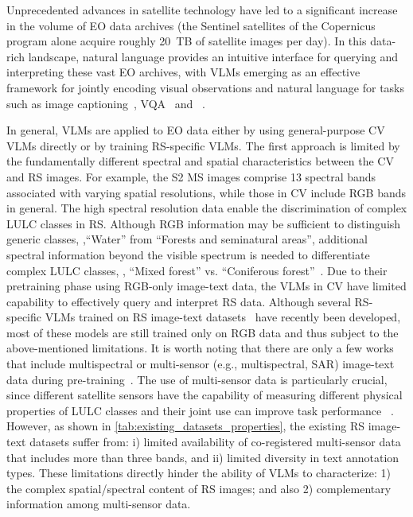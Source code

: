     
Unprecedented advances in satellite technology have led to a significant increase in the volume of \ac{EO} data archives (\eg the Sentinel satellites of the Copernicus program alone acquire roughly 20~TB of satellite images per day).
In this data-rich landscape, natural language provides an intuitive interface for querying and interpreting these vast \ac{EO} archives, with \acp{VLM} emerging as an effective framework for jointly encoding visual observations and natural language for tasks such as image captioning~\cite{cheng2022nwpu, hoxha2020toward, sumbul2020sd}, \ac{VQA}~\cite{lobry2020rsvqa, chappuis2022prompt, hackel2023lit} and \genDet~\cite{kuckreja2024geochat, soni2025earthdial, zhan2025skyeyegpt}.

In general, \acp{VLM} are applied to \ac{EO} data either by using general-purpose \ac{CV} \acp{VLM} directly or by training \ac{RS}-specific \acp{VLM}.
The first approach is limited by the fundamentally different spectral and spatial characteristics between the \ac{CV} and \ac{RS} images. For example, the \ac{S2} \ac{MS} images comprise 13 spectral bands associated with varying spatial resolutions, while those in \ac{CV} include \ac{RGB} bands in general. The high spectral resolution data enable the discrimination of complex \ac{LULC} classes in RS. Although \ac{RGB} information may be sufficient to distinguish generic classes, \eg,\enquote{Water} from \enquote{Forests and seminatural areas}, additional spectral information beyond the visible spectrum is needed to differentiate complex \ac{LULC} classes, \eg, \enquote{Mixed forest} vs. \enquote{Coniferous forest}~\cite{sumbul2019bigearthnet}. Due to their pretraining phase using \ac{RGB}-only image-text data, the \acp{VLM} in \ac{CV} have limited capability to effectively query and interpret RS data. Although several \ac{RS}-specific \acp{VLM} trained on \ac{RS} image-text datasets~\cite{bazi2024rsllava, zhan2025skyeyegpt, kuckreja2024geochat, muhtar2024lhrs} have recently been developed, most of these models are still trained only on \ac{RGB} data and thus subject to the above-mentioned limitations. It is worth noting that there are only a few works that include multispectral or multi-sensor (e.g., multispectral, \ac{SAR})  image-text data during pre-training~\cite{shu2025earthmind, soni2025earthdial}. The use of multi-sensor data is particularly crucial, since different satellite sensors have the capability of measuring different physical properties of \ac{LULC} classes and their joint use can improve task performance ~\cite{sumbul2021bigearthnet, hong2020more, Sumbul_2025_ICCV}.
However, as shown in \cref{tab:existing_datasets_properties}, the existing \ac{RS} image-text datasets suffer from: i) limited availability of co-registered multi-sensor data that includes more than three bands, and ii) limited diversity in text annotation types.
These limitations directly hinder the ability of \acp{VLM} to characterize: 1) the complex spatial/spectral content of \ac{RS} images; and also 2) complementary information among multi-sensor data. 
 

